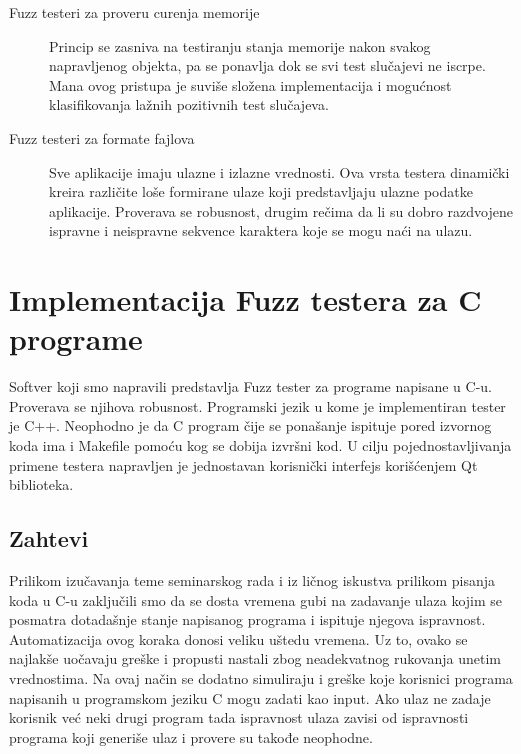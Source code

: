 \documentclass[a4paper]{article}
\begin{document}
{\begin{description}
\item[Fuzz testeri za proveru curenja memorije]
Princip se zasniva na testiranju stanja memorije nakon svakog napravljenog objekta, pa se ponavlja dok se svi test slučajevi ne iscrpe. Mana ovog pristupa je suviše složena implementacija i mogućnost klasifikovanja lažnih pozitivnih test slučajeva.
\\

\item[Fuzz testeri za formate fajlova]
Sve aplikacije imaju ulazne i izlazne vrednosti. Ova vrsta testera
dinamički kreira različite loše formirane ulaze koji predstavljaju ulazne podatke aplikacije. Proverava se robusnost, drugim rečima da li su dobro 
razdvojene ispravne i neispravne sekvence karaktera koje se mogu naći na ulazu.
\end{description}

\section{Implementacija Fuzz testera za C programe}
\label{sec:implementacija_fuzz_testera}

Softver koji smo napravili predstavlja Fuzz tester za programe napisane u C-u. Proverava se njihova robusnost. Programski jezik u kome je implementiran tester je C++. Neophodno je da C program čije se ponašanje ispituje pored izvornog koda ima i Makefile pomoću kog se dobija izvršni kod. U cilju pojednostavljivanja primene testera napravljen je jednostavan korisnički interfejs korišćenjem Qt biblioteka. 

\subsection{Zahtevi}
\label{subsec:zahtevi_testera}

Prilikom izučavanja teme seminarskog rada i iz ličnog iskustva prilikom pisanja koda u C-u zaključili smo da se dosta vremena gubi na zadavanje ulaza kojim se posmatra dotadašnje stanje napisanog programa i ispituje njegova ispravnost. Automatizacija ovog koraka donosi veliku uštedu vremena. Uz to, ovako se najlakše uočavaju greške i propusti nastali zbog neadekvatnog rukovanja unetim vrednostima. Na ovaj način se dodatno simuliraju i greške koje korisnici programa napisanih u programskom jeziku C mogu zadati kao input. Ako ulaz ne zadaje korisnik već neki drugi program tada ispravnost ulaza zavisi od ispravnosti programa koji generiše ulaz i provere su takođe neophodne.\\

}
\end{document}
